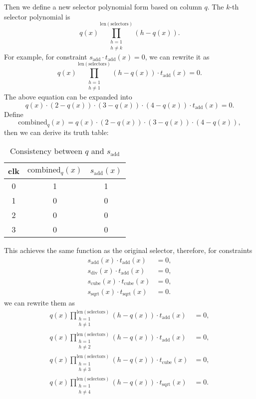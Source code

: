 Then we define a new selector polynomial form based on column $q$. The $k$-th selector polynomial is
\[ q(x)\prod_{\substack{h=1 \\ h \ne k}}^{\mathrm{len}(\text{selectors})}(h - q(x)). \]
For example, for constraint $s_\text{add} \cdot t_\text{add}(x) = 0$, we can rewrite it as
\[ q(x)\prod_{\substack{h=1 \\ h \ne 1}}^{\mathrm{len}(\text{selectors})}(h - q(x)) \cdot t_\text{add}(x) = 0. \]
The above equation can be expanded into
\[ q(x)\cdot (2- q(x))\cdot(3-q(x))\cdot (4-q(x))\cdot t_\text{add}(x) = 0. \]
Define
\[ \mathrm{combined}_q(x) = q(x)\cdot (2- q(x))\cdot(3-q(x))\cdot (4-q(x)), \]
then we can derive its truth table:
\begin{table}[!ht]
    \centering
    \begin{tabular}{|c|c|c|}
      \hline
      clk & $\mathrm{combined}_q(x)$ & $s_\text{add}(x)$ \\
      \hline
      0 & 1 & 1 \\
      1 & 0 & 0 \\
      2 & 0 & 0 \\
      3 & 0 & 0 \\
      \hline
    \end{tabular}
    \caption{Consistency between $q$ and $s_\text{add}$}
\end{table}

This achieves the same function as the original selector, therefore, for constraints
\begin{align*}
s_\text{add}(x) \cdot t_\text{add}(x) &= 0, \\
s_\text{div}(x) \cdot t_\text{add}(x) &= 0, \\
s_\text{cube}(x) \cdot t_\text{cube}(x) &= 0, \\
s_\text{sqrt}(x) \cdot t_\text{sqrt}(x) &= 0.
\end{align*}
we can rewrite them as
\begin{align*}
q(x)\prod_{\substack{h=1 \\ h \ne 1}}^{\mathrm{len}(\text{selectors})}(h - q(x)) \cdot t_\text{add}(x) &= 0, \\
q(x)\prod_{\substack{h=1 \\ h \ne 2}}^{\mathrm{len}(\text{selectors})}(h - q(x)) \cdot t_\text{add}(x) &= 0, \\
q(x)\prod_{\substack{h=1 \\ h \ne 3}}^{\mathrm{len}(\text{selectors})}(h - q(x)) \cdot t_\text{cube}(x) &= 0, \\
q(x)\prod_{\substack{h=1 \\ h \ne 4}}^{\mathrm{len}(\text{selectors})}(h - q(x)) \cdot t_\text{sqrt}(x) &= 0.
\end{align*}


